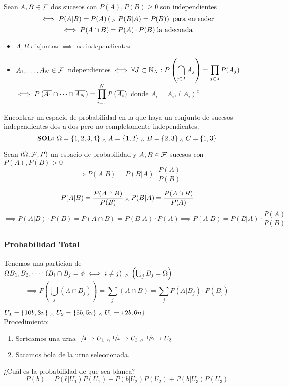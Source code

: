 \begin{defn}[Independencia]
    Sean $A,B \in \mathcal{F}$ dos sucesos con $P(A), P(B) \geq 0$ son independientes
    \[\iff P(A|B) = P(A) \left(\; _{\wedge} \; P(B|A)=P(B)\right) \text{ para entender}\]
    \[\iff P(A\cap B)=P(A)\cdot P(B) \text{ la adecuada}\]
    \begin{itemize}[topsep=1pt, itemsep=1pt,parsep=3pt]
        \item $A, B$ disjuntos $\implies$ no independientes.
        \item $A_1, \dots, A_N \in \mathcal{F}$ independientes $\displaystyle \iff \forall J \subset \mathbb{N}_N: P\left(\bigcap_{j\in I} A_j\right)=\prod_{j\in J}P(A_j)$ \\
        $\displaystyle \iff P\left(\overline{A_1}\cap\cdots\cap\overline{A_N}\right)=\prod_{i=1}^N P\left(\overline{A_i}\right)$ donde $\overline{A_i}=A_i, (A_i)^c$
    \end{itemize}
\end{defn}
\begin{ejer}
    Encontrar un espacio de probabilidad en la que haya un conjunto de sucesos independientes dos a dos pero no completamente independientes.
    \[\textbf{SOL: }\Omega = \{1, 2, 3, 4\} \; _{\wedge} \; A=\{1, 2\} \; _{\wedge} \; B=\{2, 3\} \; _{\wedge} \; C=\{1,3\}\]
\end{ejer}

\begin{prop}
    Sean $(\Omega, \mathcal{F}, P)$ un espacio de probabilidad y $A, B \in \mathcal{F}$ sucesos con $P(A), P(B)>0$
    \[\implies P(A|B)=P(B|A)\cdot \frac{P(A)}{P(B)}\]
    \begin{dem}
        \[P(A|B)=\frac{P(A\cap B)}{P(B)} \; _{\wedge} \; P(B|A)=\frac{P(A\cap B)}{P(A)}\]
        \[\implies P(A|B)\cdot P(B) = P(A\cap B) = P(B|A)\cdot P(A) \implies P(A|B)=P(B|A)\cdot \frac{P(A)}{P(B)}\]
    \end{dem}
\end{prop}

\subsubsection{Probabilidad Total}
Tenemos una partición de $\Omega B_1, B_2, \dots : \left(B_i\cap B_j = \phi \iff i\ne j\right) \; _{\wedge} \; \left(\bigcup_jB_j=\Omega\right)$
\[\implies P\left(\bigcup_j(A\cap B_j)\right)=\sum_j(A\cap B)=\sum_jP(A|B_j)\cdot P(B_j)\]

\begin{ejem}
    $U_1=\{10b, 3n\} \; _{\wedge} \; U_2=\{5b, 5n\} \; _{\wedge} \; U_3=\{2b, 6n\}$ \\
    Procedimiento:
    \begin{enumerate}
        \item Sorteamos una urna $\sfrac{1}{4} \rightarrow U_1 \; _{\wedge} \; \sfrac{1}{4} \rightarrow U_2 \; _{\wedge} \; \sfrac{1}{2} \rightarrow U_3$
        \item Sacamos bola de la urna seleccionada.
    \end{enumerate}
    ¿Cuál es la probabilidad de que sea blanca?
    \[P(b)=P(b|U_1)P(U_1)+P(b|U_2)P(U_2)+P(b|U_3)P(U_3)\]
\end{ejem}

